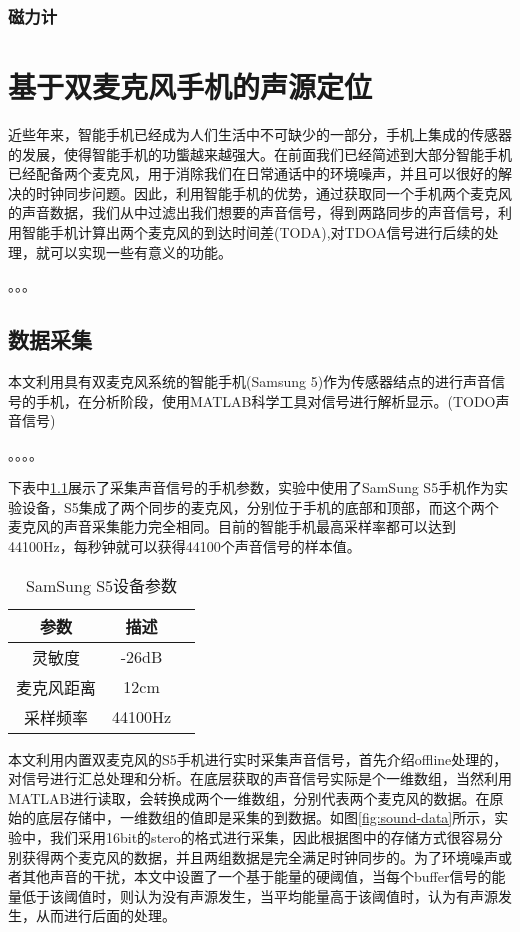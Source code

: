\documentclass[winfonts]{njuthesis}
\begin{document}
		\subsection{磁力计}

\chapter{基于双麦克风手机的声源定位}\label{chapter_work}
	近些年来，智能手机已经成为人们生活中不可缺少的一部分，手机上集成的传感器的发展，使得智能手机的功螚越来越强大。在前面我们已经简述到大部分智能手机已经配备两个麦克风，用于消除我们在日常通话中的环境噪声，并且可以很好的解决的时钟同步问题。因此，利用智能手机的优势，通过获取同一个手机两个麦克风的声音数据，我们从中过滤出我们想要的声音信号，得到两路同步的声音信号，利用智能手机计算出两个麦克风的到达时间差(TODA),对TDOA信号进行后续的处理，就可以实现一些有意义的功能。
	
	。。。
	
	
	\section{数据采集}
	本文利用具有双麦克风系统的智能手机(Samsung 5)作为传感器结点的进行声音信号的手机，在分析阶段，使用MATLAB科学工具对信号进行解析显示。(TODO声音信号)
	
	。。。。
	
	下表中\ref{table:parameters-of-S5}展示了采集声音信号的手机参数，实验中使用了SamSung S5手机作为实验设备，S5集成了两个同步的麦克风，分别位于手机的底部和顶部，而这个两个麦克风的声音采集能力完全相同。目前的智能手机最高采样率都可以达到44100Hz，每秒钟就可以获得44100个声音信号的样本值。
	
	\begin{table}[htbp]
		\setlength{\belowcaptionskip}{7pt}
		\caption{SamSung S5设备参数}
		\centering
		\begin{tabular}{ccc}
			\hline 
			参数 & 描述 \\
			\hline
			灵敏度 & -26dB\\
			麦克风距离 & 12cm \\
			采样频率 & 44100Hz\\
			\hline
		\end{tabular} 
		\vspace{0.2cm}
		\label{table:parameters-of-S5}
	\end{table}

	本文利用内置双麦克风的S5手机进行实时采集声音信号，首先介绍offline处理的，对信号进行汇总处理和分析。在底层获取的声音信号实际是个一维数组，当然利用MATLAB进行读取，会转换成两个一维数组，分别代表两个麦克风的数据。在原始的底层存储中，一维数组的值即是采集的到数据。如图\ref{fig:sound-data}所示，实验中，我们采用16bit的stero的格式进行采集，因此根据图中的存储方式很容易分别获得两个麦克风的数据，并且两组数据是完全满足时钟同步的。为了环境噪声或者其他声音的干扰，本文中设置了一个基于能量的硬阈值，当每个buffer信号的能量低于该阈值时，则认为没有声源发生，当平均能量高于该阈值时，认为有声源发生，从而进行后面的处理。
	
\end{document}
